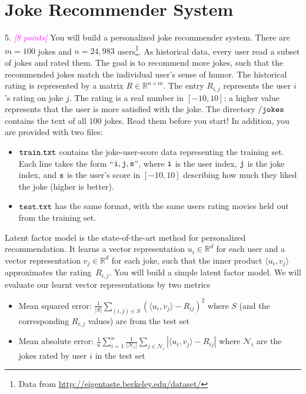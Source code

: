 \documentclass{article}
\newcommand{\field}[1]{\mathbb{#1}}
\newcommand{\1}{\mathbf{1}}
\newcommand{\R}{\field{R}} %
\newcommand{\grade}[1]{\small\textcolor{magenta}{\emph{[#1 points]}} \normalsize}
\begin{document}


\newpage




















\section{Joke Recommender System}

5. \grade{8} You will build a personalized joke recommender system. There are $m = 100$ jokes and $n = 24,983$ users\footnote{Data from \url{http://eigentaste.berkeley.edu/dataset/}}. As historical data, every user read a subset of jokes and rated them. The goal is to recommend more jokes, such that the recommended jokes match the individual user's sense of humor.
The historical rating is represented by a matrix $R\in \R^{n \times m}$. The entry $R_{i,j}$ represents the user $i$'s rating on joke $j$. The rating is a real number in $[-10,10]$: a higher value represents that the user is more satisfied with the joke.
The directory $\tt /jokes$ contains the text of all $100$ jokes. Read them before you start! In addition, you are provided with two files:
\begin{itemize}
\item $\tt train.txt$ contains the joke-user-score data representing the training set. Each line takes the form ``$\tt i,j,s$'', where $\tt i$ is the user index, $\tt j$ is the joke index, and $\tt s$ is the user's score in $[-10,10]$ describing how much they liked the joke (higher is better).
\item $\tt test.txt$ has the same format, with the same users rating movies held out from the training set.
\end{itemize}

Latent factor model is the state-of-the-art method for personalized recommendation. It learns a vector representation $u_i\in \R^d$ for each user and a vector representation $v_j\in \R^d$ for each joke, such that
the inner product $\langle u_i,v_j\rangle$ approximates the rating~$R_{i,j}$. You will build a simple latent factor model.
We will evaluate our learnt vector representations by two metrics
\begin{itemize}
  \item Mean squared error: $\frac{1}{|S|} \sum_{(i,j)\in S} (\langle u_i,v_j\rangle - R_{ij})^2$ where $S$ (and the corresponding $R_{i,j}$ values) are from the test set
  \item Mean absolute error: $\frac{1}{n} \sum_{i=1}^n \frac{1}{|\mathcal{N}_i|} \sum_{j \in \mathcal{N}_i} |\langle u_i,v_j\rangle - R_{ij}|$ where $\mathcal{N}_i$ are the jokes rated by user $i$ in the test set
\end{itemize}  
\end{document}
